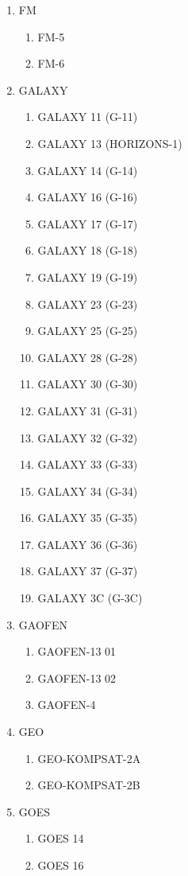 \begin{multicols}{2}
\begin{enumerate}
  \item FM
  \begin{enumerate}
    \item FM-5
    \item FM-6
  \end{enumerate}
  \item GALAXY
  \begin{enumerate}
    \item GALAXY 11 (G-11)
    \item GALAXY 13 (HORIZONS-1)
    \item GALAXY 14 (G-14)
    \item GALAXY 16 (G-16)
    \item GALAXY 17 (G-17)
    \item GALAXY 18 (G-18)
    \item GALAXY 19 (G-19)
    \item GALAXY 23 (G-23)
    \item GALAXY 25 (G-25)
    \item GALAXY 28 (G-28)
    \item GALAXY 30 (G-30)
    \item GALAXY 31 (G-31)
    \item GALAXY 32 (G-32)
    \item GALAXY 33 (G-33)
    \item GALAXY 34 (G-34)
    \item GALAXY 35 (G-35)
    \item GALAXY 36 (G-36)
    \item GALAXY 37 (G-37)
    \item GALAXY 3C (G-3C)
  \end{enumerate}
  \item GAOFEN
  \begin{enumerate}
    \item GAOFEN-13 01
    \item GAOFEN-13 02
    \item GAOFEN-4
  \end{enumerate}
  \item GEO
  \begin{enumerate}
    \item GEO-KOMPSAT-2A
    \item GEO-KOMPSAT-2B
  \end{enumerate}
  \item GOES
  \begin{enumerate}
    \item GOES 14
    \item GOES 16

\end{enumerate}
\end{enumerate}
\end{multicols}
